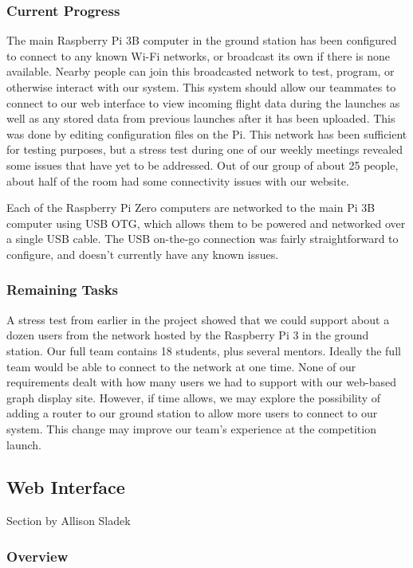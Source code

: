 \documentclass[onecolumn, draftclsnofoot, 10pt, compsoc]{IEEEtran}
\begin{document}
\subsubsection{Current Progress}
The main Raspberry Pi 3B computer in the ground station has been configured to connect to any known Wi-Fi networks, or broadcast its own if there is none available.
Nearby people can join this broadcasted network to test, program, or otherwise interact with our system.
This system should allow our teammates to connect to our web interface to view incoming flight data during the launches as well as any stored data from previous launches after it has been uploaded.
This was done by editing configuration files on the Pi.
This network has been sufficient for testing purposes, but a stress test during one of our weekly meetings revealed some issues that have yet to be addressed.
Out of our group of about 25 people, about half of the room had some connectivity issues with our website.

Each of the Raspberry Pi Zero computers are networked to the main Pi 3B computer using USB OTG, which allows them to be powered and networked over a single USB cable. The USB on-the-go connection was fairly straightforward to configure, and doesn’t currently have any known issues.


\subsubsection{Remaining Tasks}
A stress test from earlier in the project showed that we could support about a dozen users from the network hosted by the Raspberry Pi 3 in the ground station.
Our full team contains 18 students, plus several mentors.
Ideally the full team would be able to connect to the network at one time.
None of our requirements dealt with how many users we had to support with our web-based graph display site.
However, if time allows, we may explore the possibility of adding a router to our ground station to allow more users to connect to our system.
This change may improve our team's experience at the competition launch.
\subsection{Web Interface}
Section by Allison Sladek
\subsubsection{Overview}
\end{document}
